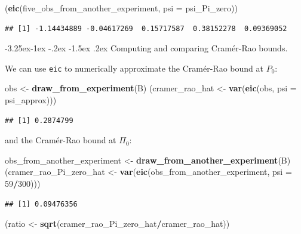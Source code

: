 \documentclass[]{article}
\makeatletter
\newenvironment{Shaded}{\begin{snugshade}}{\end{snugshade}}
\newcommand{\DataTypeTok}[1]{\textcolor[rgb]{0.13,0.29,0.53}{#1}}
\newcommand{\DecValTok}[1]{\textcolor[rgb]{0.00,0.00,0.81}{#1}}
\newcommand{\KeywordTok}[1]{\textcolor[rgb]{0.13,0.29,0.53}{\textbf{#1}}}
\newcommand{\NormalTok}[1]{#1}
\newcommand{\OperatorTok}[1]{\textcolor[rgb]{0.81,0.36,0.00}{\textbf{#1}}}
\newcommand{\StringTok}[1]{\textcolor[rgb]{0.31,0.60,0.02}{#1}}
\renewcommand\subsection{\@startsection{subsection}{3}{\z@}%
                                     {-3.25ex\@plus -1ex \@minus -.2ex}%
                                     {-1.5ex \@plus .2ex}%
                                     {\normalfont\normalsize\bfseries}}
\theoremstyle{definition}
\theoremstyle{definition}
\theoremstyle{definition}
\theoremstyle{remark}
\makeatother
\begin{document}
\begin{Shaded}
\begin{Highlighting}[]
\NormalTok{(}\KeywordTok{eic}\NormalTok{(five_obs_from_another_experiment, }\DataTypeTok{psi =}\NormalTok{ psi_Pi_zero))}
\end{Highlighting}
\end{Shaded}

\begin{verbatim}
## [1] -1.14434889 -0.04617269  0.15717587  0.38152278  0.09369052
\end{verbatim}

\subsection{Computing and comparing Cramér-Rao bounds.}

We can use \texttt{eic} to numerically approximate the Cramér-Rao bound
at \(P_{0}\):

\begin{Shaded}
\begin{Highlighting}[]
\NormalTok{obs <-}\StringTok{ }\KeywordTok{draw_from_experiment}\NormalTok{(B)}
\NormalTok{(cramer_rao_hat <-}\StringTok{ }\KeywordTok{var}\NormalTok{(}\KeywordTok{eic}\NormalTok{(obs, }\DataTypeTok{psi =}\NormalTok{ psi_approx)))}
\end{Highlighting}
\end{Shaded}

\begin{verbatim}
## [1] 0.2874799
\end{verbatim}

and the Cramér-Rao bound at \(\Pi_{0}\):

\begin{Shaded}
\begin{Highlighting}[]
\NormalTok{obs_from_another_experiment <-}\StringTok{ }\KeywordTok{draw_from_another_experiment}\NormalTok{(B)}
\NormalTok{(cramer_rao_Pi_zero_hat <-}\StringTok{ }\KeywordTok{var}\NormalTok{(}\KeywordTok{eic}\NormalTok{(obs_from_another_experiment, }\DataTypeTok{psi =} \DecValTok{59}\OperatorTok{/}\DecValTok{300}\NormalTok{)))}
\end{Highlighting}
\end{Shaded}

\begin{verbatim}
## [1] 0.09476356
\end{verbatim}

\begin{Shaded}
\begin{Highlighting}[]
\NormalTok{(ratio <-}\StringTok{ }\KeywordTok{sqrt}\NormalTok{(cramer_rao_Pi_zero_hat}\OperatorTok{/}\NormalTok{cramer_rao_hat))}
\end{Highlighting}
\end{Shaded}
\end{document}
